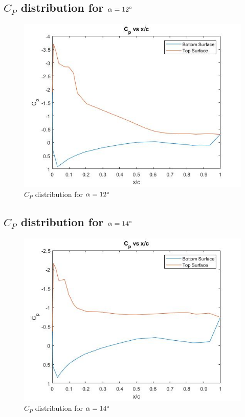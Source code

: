 \documentclass[12pt]{article}
\begin{document}
        \newpage
    \subsection{\(C_P\) distribution for \(\alpha = 12\degree\)}
    \begin{figure}[h]
        \includegraphics[width=16 cm]{12.jpg}
        \centering
        \caption{\(C_P\) distribution for \(\alpha = 12\degree\)}
    \end{figure}
    
        \newpage
    \subsection{\(C_P\) distribution for \(\alpha = 14\degree\)}
    \begin{figure}[h]
        \includegraphics[width=16 cm]{14.jpg}
        \centering
        \caption{\(C_P\) distribution for \(\alpha = 14\degree\)}
    \end{figure}
    
\end{document}

